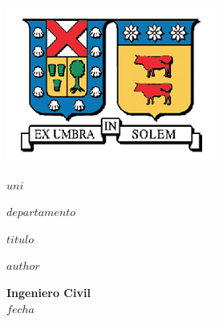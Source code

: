 \documentclass[$if(fontsize)$$fontsize$,$endif$$if(lang)$$babel-lang$,$endif$$if(papersize)$$papersize$paper,$endif$$for(classoption)$$classoption$$sep$,$endfor$]{$documentclass$}
\begin{document}



\pagestyle{empty}

\begin{center}

\begin{center}
  \includegraphics{images/logo_new.png}
\end{center}


\large \textbf{$uni$}

\large \textbf{$departamento$}

\vspace{40mm}

\Large {\bf $titulo$}

\vspace{40mm}

\large \textbf{$author$}

\vspace{5mm}

\textbf{Ingeniero Civil}\\




\vspace{5mm}
$fecha$


\end{center}



\pagestyle{empty}
\end{document}
